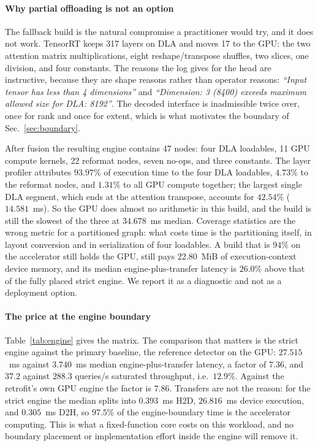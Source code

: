 \paragraph*{Why partial offloading is not an option}
The fallback build is the natural compromise a practitioner would try, and it
does not work. TensorRT keeps 317 layers on DLA and moves 17 to the GPU: the two
attention matrix multiplications, eight reshape/transpose shuffles, two slices,
one division, and four constants. The reasons the log gives for the head are
instructive, because they are shape reasons rather than operator reasons:
\emph{``Input tensor has less than 4 dimensions''} and \emph{``Dimension: 3
(8400) exceeds maximum allowed size for DLA: 8192''}. The decoded interface is
inadmissible twice over, once for rank and once for extent, which is what
motivates the boundary of Sec.~\ref{sec:boundary}.

After fusion the resulting engine contains 47 nodes: four DLA loadables, 11 GPU
compute kernels, 22 reformat nodes, seven no-ops, and three constants. The layer
profiler attributes $93.97\%$ of execution time to the four DLA loadables,
$4.73\%$ to the reformat nodes, and $1.31\%$ to all GPU compute together; the
largest single DLA segment, which ends at the attention transpose, accounts for
$42.54\%$ ($14.581$~ms). So the GPU does almost no arithmetic in this build, and
the build is still the slowest of the three at $34.678$~ms median. Coverage
statistics are the wrong metric for a partitioned graph: what costs time is the
partitioning itself, in layout conversion and in serialization of four
loadables. A build that is $94\%$ on the accelerator still holds the GPU, still
pays $22.80$~MiB of execution-context device memory, and its median
engine-plus-transfer latency is $26.0\%$ above that of the fully placed strict
engine. We report it as a diagnostic and not as a
deployment option.

\paragraph*{The price at the engine boundary}
Table~\ref{tab:engine} gives the matrix. The comparison that matters is the
strict engine against the primary baseline, the reference detector on the GPU:
$27.515$~ms against $3.740$~ms median engine-plus-transfer latency, a factor of
$7.36$, and $37.2$ against $288.3$ queries/s saturated throughput, i.e.\
$12.9\%$. Against the retrofit's own GPU engine the factor is $7.86$. Transfers
are not the reason: for the strict engine the median splits into $0.393$~ms
H2D, $26.816$~ms device execution, and $0.305$~ms D2H, so $97.5\%$ of the
engine-boundary time is the accelerator computing. This is what a
fixed-function core costs on this workload, and no boundary placement or
implementation effort inside the engine will remove it.

